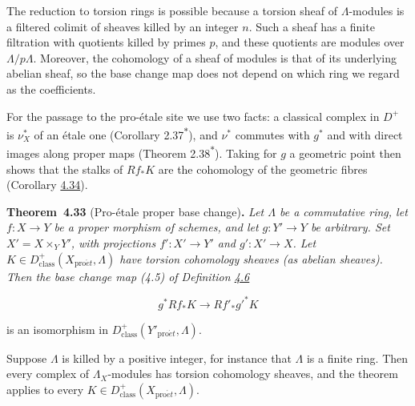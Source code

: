 \documentclass[11pt]{article}
\newenvironment{bpstatement}[2]{\par\addvspace{0.6\baselineskip}\noindent\textbf{#1}#2\textbf{.}\enspace\ignorespaces}
  {\par\addvspace{0.4\baselineskip}}
\newenvironment{bpstatementit}[2]{\begin{bpstatement}{#1}{#2}\itshape\ignorespaces}{\end{bpstatement}}
\newcommand{\bpout}[1]{#1\textsuperscript{\hyperlink{bp-outside}{\ensuremath{\ast}}}}
\begin{document}
The reduction to torsion rings is possible because a torsion sheaf of \(\Lambda\)-modules is a filtered colimit of sheaves killed by an integer \(n\). Such a sheaf has a finite filtration with quotients killed by primes \(p\), and these quotients are modules over \(\Lambda/p\Lambda\). Moreover, the cohomology of a sheaf of modules is that of its underlying abelian sheaf, so the base change map does not depend on which ring we regard as the coefficients.

For the passage to the pro-étale site we use two facts: a classical complex in \(D^+\) is \(\nu_X^*\) of an étale one (Corollary \bpout{2.37}), and \(\nu^*\) commutes with \(g^*\) and with direct images along proper maps (Theorem \bpout{2.38}). Taking for \(g\) a geometric point then shows that the stalks of \(Rf_*K\) are the cohomology of the geometric fibres (Corollary \hyperref[bp102]{4.34}).

\label{bp98}%
\begin{bpstatementit}{Theorem~4.33}{ (Pro-étale proper base change)}
Let \(\Lambda\) be a commutative ring, let \(f:X\to Y\) be a proper morphism of schemes, and let \(g:Y'\to Y\) be arbitrary. Set \(X'=X\times_YY'\), with projections \(f':X'\to Y'\) and \(g':X'\to X\). Let \(K\in D^+_{\mathrm{class}}(X_{\mathrm{pro}\acute{e}t},\Lambda)\) have torsion cohomology sheaves (as abelian sheaves). Then the base change map (4.5) of Definition \hyperref[bp18]{4.6}

\[
g^*Rf_*K\longrightarrow Rf'_*g'^*K
\]

is an isomorphism in \(D^+_{\mathrm{class}}(Y'_{\mathrm{pro}\acute{e}t},\Lambda)\).
\end{bpstatementit}

\label{bp99}%
Suppose \(\Lambda\) is killed by a positive integer, for instance that \(\Lambda\) is a finite ring. Then every complex of \(\Lambda_X\)-modules has torsion cohomology sheaves, and the theorem applies to every \(K\in D^+_{\mathrm{class}}(X_{\mathrm{pro}\acute{e}t},\Lambda)\).
\end{document}
